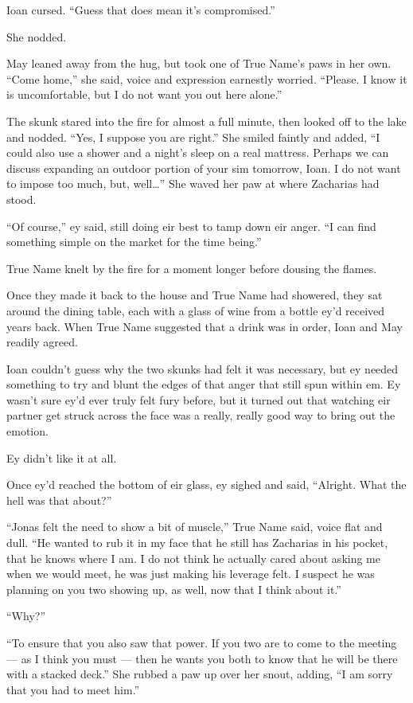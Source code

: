 Ioan cursed. ``Guess that does mean it's compromised.''

She nodded.

May leaned away from the hug, but took one of True Name's paws in her own. ``Come home,'' she said, voice and expression earnestly worried. ``Please. I know it is uncomfortable, but I do not want you out here alone.''

The skunk stared into the fire for almost a full minute, then looked off to the lake and nodded. ``Yes, I suppose you are right.'' She smiled faintly and added, ``I could also use a shower and a night's sleep on a real mattress. Perhaps we can discuss expanding an outdoor portion of your sim tomorrow, Ioan. I do not want to impose too much, but, well\ldots{}'' She waved her paw at where Zacharias had stood.

``Of course,'' ey said, still doing eir best to tamp down eir anger. ``I can find something simple on the market for the time being.''

True Name knelt by the fire for a moment longer before dousing the flames.

Once they made it back to the house and True Name had showered, they sat around the dining table, each with a glass of wine from a bottle ey'd received years back. When True Name suggested that a drink was in order, Ioan and May readily agreed.

Ioan couldn't guess why the two skunks had felt it was necessary, but ey needed something to try and blunt the edges of that anger that still spun within em. Ey wasn't sure ey'd ever truly felt fury before, but it turned out that watching eir partner get struck across the face was a really, really good way to bring out the emotion.

Ey didn't like it at all.

Once ey'd reached the bottom of eir glass, ey sighed and said, ``Alright. What the hell was that about?''

``Jonas felt the need to show a bit of muscle,'' True Name said, voice flat and dull. ``He wanted to rub it in my face that he still has Zacharias in his pocket, that he knows where I am. I do not think he actually cared about asking me when we would meet, he was just making his leverage felt. I suspect he was planning on you two showing up, as well, now that I think about it.''

``Why?''

``To ensure that you also saw that power. If you two are to come to the meeting — as I think you must — then he wants you both to know that he will be there with a stacked deck.'' She rubbed a paw up over her snout, adding, ``I am sorry that you had to meet him.''

